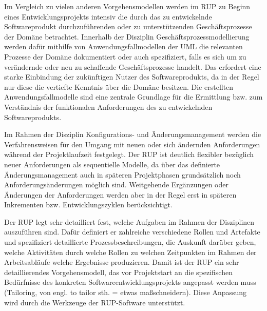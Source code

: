 \vspace{2mm} %


Im  Vergleich zu vielen anderen Vorgehensmodellen werden im RUP zu Beginn eines Entwicklungsprojekts intensiv die durch das zu entwickelnde Softwareprodukt durchzuführenden oder zu unterstützenden Geschäftsprozesse der Domäne betrachtet. Innerhalb der Disziplin Geschäftsprozessmodellierung werden dafür mithilfe von Anwendungsfall\-mo\-dellen der UML %
die relevanten Prozesse der Domäne dokumentiert oder auch spezifiziert, falls es sich um zu verändernde oder neu zu schaffende Geschäftsprozesse handelt. Das erfordert eine starke Einbindung der zukünftigen Nutzer des Softwareprodukts, da in der Regel nur diese die vertiefte Kenntnis über die Domäne besitzen. Die erstellten Anwendungsfallmodelle sind eine zentrale Grundlage für die Ermittlung bzw. zum Verständnis der funktionalen Anforderungen 
des zu entwickelnden Softwareprodukts.

Im Rahmen der Disziplin Konfigurations- und Änderungsmanagement werden die Verfahrensweisen für den Umgang mit neuen oder sich ändernden Anforderungen während der Projektlaufzeit festgelegt. Der RUP ist deutlich flexibler bezüglich neuer Anforderungen als sequentielle Modelle, da über das definierte Änderungs\-management auch in späteren Projektphasen grundsätzlich noch Anforderungsänderungen möglich sind. Weitgehende Ergänzungen oder Änderungen der Anforderungen werden aber in der Regel erst in späteren Inkrementen bzw. Entwicklungszyklen berücksichtigt.

\vspace{2mm} %


Der RUP legt sehr detailliert fest, welche Aufgaben im Rahmen der Disziplinen auszuführen sind. Dafür definiert er zahlreiche verschiedene Rollen und Artefakte und spezifiziert detaillierte Prozessbeschreibungen, die Auskunft darüber geben, welche Aktivitäten durch welche Rollen zu welchen Zeitpunkten im Rahmen der Arbeitsabläufe welche Ergebnisse produzieren. Damit ist der RUP ein sehr detaillierendes Vorgehensmodell, das vor Projektstart an die spezifischen Bedürfnisse des konkreten Softwareentwicklungsprojekts angepasst werden muss (Tailoring, von engl. to tailor sth. = etwas maßschneidern). Diese Anpassung wird durch die Werkzeuge der RUP-Software unterstützt.

